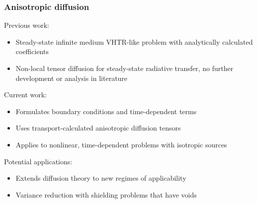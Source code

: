 \documentclass{beamer}
\begin{document}
\begin{frame}
  \frametitle{Anisotropic diffusion}
  Previous work:
  \begin{itemize}
    \item Steady-state infinite medium VHTR-like problem with analytically
      calculated coefficients \cite{Lar2009c}
    \item Non-local tensor diffusion \cite{Mor2007} for steady-state
      radiative transfer, no further development or analysis in literature
  \end{itemize}
  Current work:
  \begin{itemize}
    \item Formulates boundary conditions and time-dependent terms
    \item Uses transport-calculated anisotropic diffusion tensors
    \item Applies to nonlinear, time-dependent problems with isotropic sources
  \end{itemize}
  Potential applications:
  \begin{itemize}
    \item Extends diffusion theory to new regimes of applicability
    \item Variance reduction with shielding problems that have voids
  \end{itemize}
\end{frame}

\end{document}

